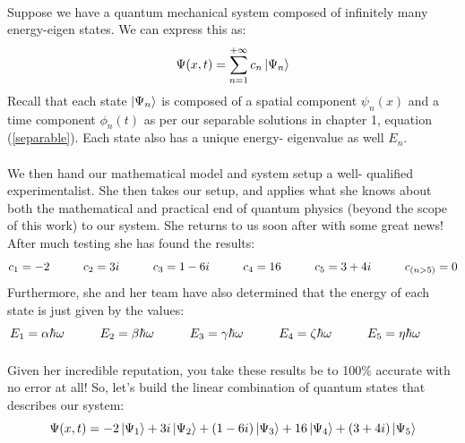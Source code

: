 \documentclass[12pt,letterpaper]{book}
\begin{document}
\paragraph*{}Suppose we have a quantum mechanical system composed of infinitely many energy-eigen states. We can express this as:
\begin{equation}
\Psi(x,t) = \sum_{n=1}^{+\infty} c_n \ket{\Psi_n}
\end{equation}
Recall that each state $\ket{\Psi_n}$ is composed of a spatial component $\psi_n(x)$ and a time component $\phi_n(t)$ as per our separable solutions in chapter 1, equation (\ref{separable}). Each state also has a unique energy- eigenvalue as well $E_n$.
\paragraph*{}We then hand our mathematical model and system setup a well- qualified experimentalist. She then takes our setup, and applies what she knows about both the mathematical and practical end of quantum physics (beyond the scope of this work) to our system. She returns to us soon after with some great news! After much testing she has found the results:
\begin{equation}
c_1 = -2 \hspace*{1cm}
c_2 = 3i \hspace*{1cm}
c_3 = 1 - 6i \hspace{1cm}
c_4 = 16 \hspace*{1cm}
c_5 = 3 + 4i \hspace{1cm}
c_{(n > 5)} = 0
\end{equation}
Furthermore, she and her team have also determined that the energy of each state is just given by the values:
\begin{equation}
E_1 = \alpha\hbar\omega \hspace*{1cm} 
E_2 = \beta\hbar\omega \hspace*{1cm} 
E_3 = \gamma\hbar\omega \hspace*{1cm}
E_4 = \zeta\hbar\omega \hspace*{1cm} 
E_5 = \eta\hbar\omega \hspace*{1cm}
\end{equation}
\paragraph*{}Given her incredible reputation, you take these results be to 100\% accurate with no error at all! So, let's build the linear combination of quantum states that describes our system:
\begin{equation}
\Psi(x,t) = -2\ket{\Psi_1} + 3i\ket{\Psi_2} + (1-6i)\ket{\Psi_3} +
16\ket{\Psi_4} + (3 + 4i)\ket{\Psi_5}
\end{equation}
\end{document}
